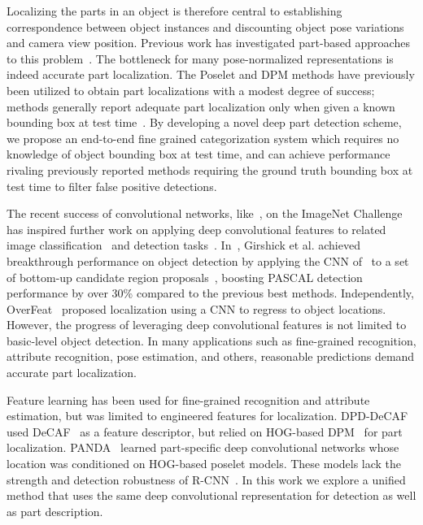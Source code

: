 Localizing the parts in an object is therefore central to establishing correspondence between object instances and discounting object pose variations and camera view position. Previous work has investigated part-based approaches to this problem~\cite{poof,BirdletsFarrellICCV11,iccv13_keypoint,UW_NIPS12,PosePoolingKernelsZhangEtalCVPR12,Goering14:NPT}. The bottleneck for many pose-normalized representations
is indeed accurate part localization.
The Poselet \cite{BourdevMalikICCV09} and DPM \cite{dpm} methods have previously been utilized to obtain part localizations with a modest degree of success; methods generally report adequate part localization only when given a known bounding box at test time~\cite{Tricos_Chai_ECCV12,iccv13_alignment,ParkhiEtalICCV11,ParkhiEtalCVPR12,iccv13_partmatching}. By developing a novel deep part detection scheme, we propose an end-to-end fine grained categorization system which requires no knowledge of object bounding box at test time, and can achieve performance rivaling previously reported methods requiring the ground truth bounding box at test time to filter false positive detections.

The recent success of convolutional networks, like~\cite{krizhevsky}, on the ImageNet Challenge~\cite{ILSVRC} has inspired further work on applying deep convolutional features to related image classification~\cite{decaf} and detection tasks~\cite{rcnn}.
In~\cite{rcnn}, Girshick et al. achieved breakthrough performance on object detection by applying the CNN of~\cite{krizhevsky} to a set of bottom-up candidate region proposals~\cite{selsearch}, boosting PASCAL detection performance by over 30\% compared to the previous best methods.
Independently, OverFeat~\cite{overfeat} proposed localization using a CNN to regress to object locations.
However, the progress of leveraging deep convolutional features is not limited to basic-level object detection.
In many applications such as fine-grained recognition, attribute recognition, pose estimation, and others, reasonable predictions demand accurate part localization.

Feature learning has been used for fine-grained recognition and attribute estimation, but was limited to engineered features for localization.
DPD-DeCAF~\cite{dpd} used DeCAF~\cite{decaf} as a feature descriptor, but relied on HOG-based DPM~\cite{dpm} for part localization.
PANDA~\cite{panda} learned part-specific deep convolutional networks whose location was conditioned on HOG-based poselet models.
These models lack the strength and detection robustness of R-CNN~\cite{rcnn}.
In this work we explore a unified method that uses the same deep convolutional representation for detection as well as part description.

